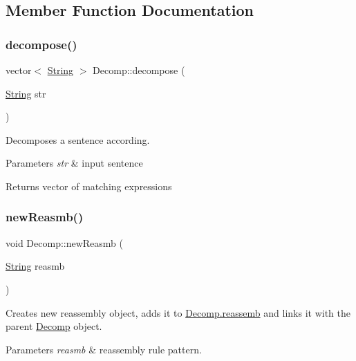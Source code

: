 \subsection{Member Function Documentation}
\mbox{\label{classDecomp_a5778e75423e33df37fe2e41157d3bc03}} 
\subsubsection{\texorpdfstring{decompose()}{decompose()}}
{\footnotesize\ttfamily vector$<$ \mbox{\hyperlink{classString}{String}} $>$ Decomp\+::decompose (\begin{DoxyParamCaption}\item[{\mbox{\hyperlink{classString}{String}}}]{str }\end{DoxyParamCaption})}

Decomposes a sentence according. 
\begin{DoxyParams}{Parameters}
{\em str} & input sentence \\
\hline
\end{DoxyParams}
\begin{DoxyReturn}{Returns}
vector of matching expressions 
\end{DoxyReturn}
\mbox{\label{classDecomp_a8ff1983b817d90d03b5f2726cc2e7af8}} 
\subsubsection{\texorpdfstring{new\+Reasmb()}{newReasmb()}}
{\footnotesize\ttfamily void Decomp\+::new\+Reasmb (\begin{DoxyParamCaption}\item[{\mbox{\hyperlink{classString}{String}}}]{reasmb }\end{DoxyParamCaption})}

Creates new reassembly object, adds it to \mbox{\hyperlink{classDecomp_a2ca89dea0471f80c7921955fafdf8513}{Decomp.\+reassemb}} and links it with the parent \mbox{\hyperlink{classDecomp}{Decomp}} object. 
\begin{DoxyParams}{Parameters}
{\em reasmb} & reassembly rule pattern. \\
\hline
\end{DoxyParams}
\mbox{\label{classDecomp_ae3a21380fd65ef17ca0c1b4bb4aa7875}} 
